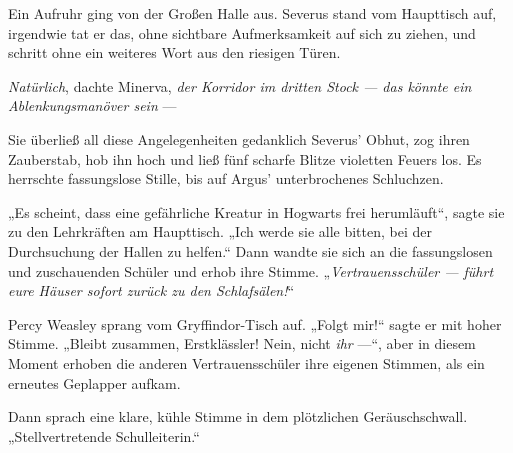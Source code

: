 Ein Aufruhr ging von der Großen Halle aus. Severus stand vom Haupttisch auf, irgendwie tat er das, ohne sichtbare Aufmerksamkeit auf sich zu ziehen, und schritt ohne ein weiteres Wort aus den riesigen Türen.

\emph{Natürlich}, dachte Minerva, \emph{der Korridor im dritten Stock — das könnte ein Ablenkungsmanöver sein} —

Sie überließ all diese Angelegenheiten gedanklich Severus’ Obhut, zog ihren Zauberstab, hob ihn hoch und ließ fünf scharfe Blitze violetten Feuers los.
Es herrschte fassungslose Stille, bis auf Argus’ unterbrochenes Schluchzen.

„Es scheint, dass eine gefährliche Kreatur in Hogwarts frei herumläuft“, sagte sie zu den Lehrkräften am Haupttisch.
„Ich werde sie alle bitten, bei der Durchsuchung der Hallen zu helfen.“ Dann wandte sie sich an die fassungslosen und zuschauenden Schüler und erhob ihre Stimme.
„\emph{Vertrauensschüler — führt eure Häuser sofort zurück zu den Schlafsälen!}“

Percy Weasley sprang vom Gryffindor-Tisch auf.
„Folgt mir!“ sagte er mit hoher Stimme.
„Bleibt zusammen, Erstklässler! Nein, nicht \emph{ihr} —“, aber in diesem Moment erhoben die anderen Vertrauensschüler ihre eigenen Stimmen, als ein erneutes Geplapper aufkam.

Dann sprach eine klare, kühle Stimme in dem plötzlichen Geräuschschwall.
„Stellvertretende Schulleiterin.“


